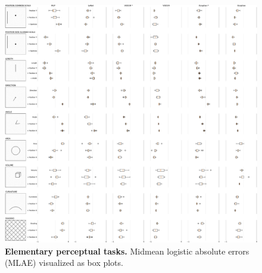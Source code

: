 \documentclass[journal]{vgtc}                %
\begin{document}
\begin{figure}[p]
	\centering
		\includegraphics[width=\linewidth]{../gfx/figure1_boxplot_new.pdf}
  \caption{\textbf{Elementary perceptual tasks.} Midmean logistic absolute errors (MLAE) visualized as box plots.}
	\label{fig:epc_mlae_boxplots}
\end{figure}
\end{document}
